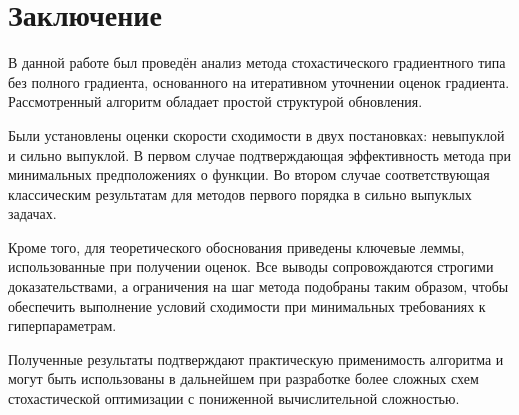 \section{Заключение}

В данной работе был проведён анализ метода стохастического градиентного типа без полного градиента, основанного на итеративном уточнении оценок градиента. Рассмотренный алгоритм обладает простой структурой обновления.

Были установлены оценки скорости сходимости в двух постановках: невыпуклой и сильно выпуклой. В первом случае подтверждающая эффективность метода при минимальных предположениях о функции. Во втором случае соответствующая классическим результатам для методов первого порядка в сильно выпуклых задачах.

Кроме того, для теоретического обоснования приведены ключевые леммы, использованные при получении оценок. Все выводы сопровождаются строгими доказательствами, а ограничения на шаг метода подобраны таким образом, чтобы обеспечить выполнение условий сходимости при минимальных требованиях к гиперпараметрам.

Полученные результаты подтверждают практическую применимость алгоритма и могут быть использованы в дальнейшем при разработке более сложных схем стохастической оптимизации с пониженной вычислительной сложностью.